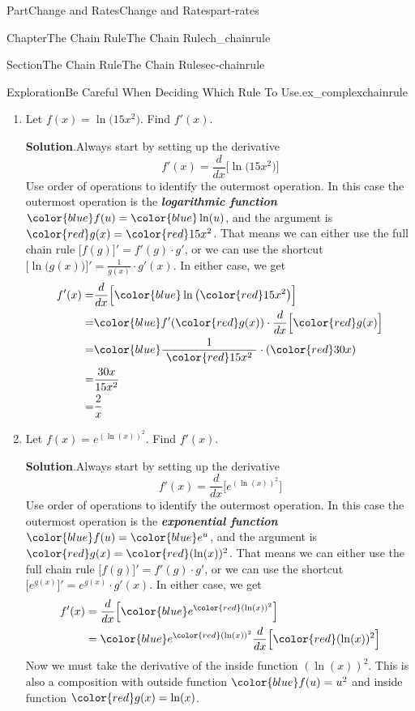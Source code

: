 \documentclass{tufte-book}
\newcommand{\blocktitlefont}{\relax}
\newcommand{\alert}[1]{\textbf{\textit{#1}}}
\numberwithin{equation}{chapter}
\newcommand{\red}[1]{   {\color{red}   #1}   }
\newcommand{\blue}[1]{  {\color{blue}  #1}  }
\newcommand{\ddx}[1]{ \dfrac{d}{dx} \Big[ #1 \Big]  }
\newcommand{\D}[1]{ \Big[ #1 \Big]'  }
\newcommand{\amp}{&}
\begin{document}
\begin{partptx}{Part}{Change and Rates}{}{Change and Rates}{}{}{part-rates}
\begin{chapterptx}{Chapter}{The Chain Rule}{}{The Chain Rule}{}{}{ch_chainrule}
\begin{sectionptx}{Section}{The Chain Rule}{}{The Chain Rule}{}{}{sec-chainrule}
\begin{exploration}{Exploration}{Be Careful When Deciding Which Rule To Use.}{ex_complexchainrule}
\begin{enumerate}[font=\bfseries,label=(\alph*),ref=\alph*]
%
\item{}Let \(f(x) = \ln\big(15x^2\big)\). Find \(f'(x)\).%
\par\smallskip%
\noindent\textbf{\blocktitlefont Solution}.\hypertarget{ex_complexchainrule-4-2}{}\quad{}Always start by setting up the derivative%
\begin{equation*}
f'(x) = \ddx{\ln\big(15x^2\big)}
\end{equation*}
Use order of operations to identify the outermost operation. In this case the outermost operation is the \alert{logarithmic function} \(\blue{f(u)} = \blue{\ln(u)}\), and the argument is \(\red{g(x)} = \red{15x^2}\).  That means we can either use the full chain rule \(\D{ f(g) } = f'(g)\cdot g'\), or we can use the shortcut \(\D{\ln\big(g(x)\big)} = \frac{1}{g(x)}\cdot g'(x)\).  In either case, we get%
\begin{align*}
f'(x) = \amp \ddx{ \blue{\ln\big(\red{15x^2}\big)} }  \\
= \amp \blue{f'(\red{g(x)})}\cdot \ddx{\red{g(x)}}\\
= \amp \blue{\dfrac{1}{\ \red{15x^2} \ }}\cdot (\red{30x})  \\
= \amp \dfrac{30x}{15x^2}\\
= \amp \dfrac{2}{x}
\end{align*}
%
\item{}Let \(f(x) = e^{(\ln(x))^2}\).  Find \(f'(x)\).%
\par\smallskip%
\noindent\textbf{\blocktitlefont Solution}.\hypertarget{ex_complexchainrule-5-2}{}\quad{}Always start by setting up the derivative%
\begin{equation*}
f'(x) = \ddx{e^{(\ln(x))^2}}
\end{equation*}
Use order of operations to identify the outermost operation. In this case the outermost operation is the \alert{exponential function} \(\blue{f(u)} = \blue{e^u}\), and the argument is \(\red{g(x)} = \red{(\ln(x))^2}\).  That means we can either use the full chain rule \(\D{ f(g) } = f'(g)\cdot g'\), or we can use the shortcut \(\D{e^{g(x)}} = e^{g(x)}\cdot g'(x)\).  In either case, we get%
\begin{align*}
f'(x) \amp = \ddx{ \blue{e^{\red{(\ln(x))^2}}} }\\
\amp =  \blue{e^{\red{(\ln(x))^2}}} \ddx{ \red{(\ln(x))^2} }
\end{align*}
Now we must take the derivative of the inside function \({(\ln(x))^2}\).  This is also a composition with outside function \(\blue{f(u)= u^2}\) and inside function \(\red{g(x) = \ln(x)}\).%

\end{enumerate}
\end{exploration}
\end{sectionptx}
\end{chapterptx}
\end{partptx}
\end{document}
